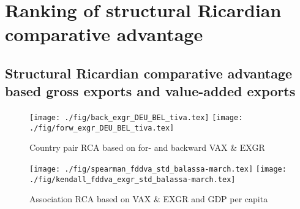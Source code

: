 \section{Ranking of structural Ricardian comparative advantage }

\subsection{Structural Ricardian comparative advantage based gross exports and value-added exports}
\begin{figure}
\caption{Country pair RCA based on for- and backward  VAX \& EXGR }
\texttt{[image: ./fig/back\_exgr\_DEU\_BEL\_tiva.tex]}
\texttt{[image: ./fig/forw\_exgr\_DEU\_BEL\_tiva.tex]}
\end{figure}
\begin{figure}
\caption{Association RCA based on VAX \& EXGR and GDP per capita }
\centering
\texttt{[image: ./fig/spearman\_fddva\_std\_balassa-march.tex]}
\texttt{[image: ./fig/kendall\_fddva\_exgr\_std\_balassa-march.tex]}
\end{figure}
\endinput